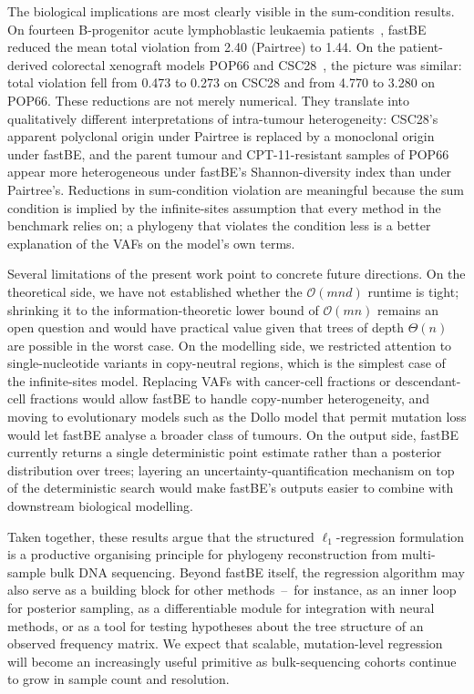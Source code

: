 \documentclass[11pt]{article}
\begin{document}
The biological implications are most clearly visible in the sum-condition results. On fourteen B-progenitor acute lymphoblastic leukaemia patients~\citep{wintersinger2022pairtree}, fastBE reduced the mean total violation from 2.40 (Pairtree) to 1.44. On the patient-derived colorectal xenograft models POP66 and CSC28~\citep{rehman2021diapause,ulintz2018polyclonal}, the picture was similar: total violation fell from 0.473 to 0.273 on CSC28 and from 4.770 to 3.280 on POP66. These reductions are not merely numerical. They translate into qualitatively different interpretations of intra-tumour heterogeneity: CSC28's apparent polyclonal origin under Pairtree is replaced by a monoclonal origin under fastBE, and the parent tumour and CPT-11-resistant samples of POP66 appear more heterogeneous under fastBE's Shannon-diversity index than under Pairtree's. Reductions in sum-condition violation are meaningful because the sum condition is implied by the infinite-sites assumption that every method in the benchmark relies on; a phylogeny that violates the condition less is a better explanation of the VAFs on the model's own terms.

Several limitations of the present work point to concrete future directions. On the theoretical side, we have not established whether the $\mathcal{O}(mnd)$ runtime is tight; shrinking it to the information-theoretic lower bound of $\mathcal{O}(mn)$ remains an open question and would have practical value given that trees of depth $\Theta(n)$ are possible in the worst case. On the modelling side, we restricted attention to single-nucleotide variants in copy-neutral regions, which is the simplest case of the infinite-sites model. Replacing VAFs with cancer-cell fractions or descendant-cell fractions would allow fastBE to handle copy-number heterogeneity, and moving to evolutionary models such as the Dollo model that permit mutation loss would let fastBE analyse a broader class of tumours. On the output side, fastBE currently returns a single deterministic point estimate rather than a posterior distribution over trees; layering an uncertainty-quantification mechanism on top of the deterministic search would make fastBE's outputs easier to combine with downstream biological modelling.

Taken together, these results argue that the structured $\ell_1$-regression formulation is a productive organising principle for phylogeny reconstruction from multi-sample bulk DNA sequencing. Beyond fastBE itself, the regression algorithm may also serve as a building block for other methods~--~for instance, as an inner loop for posterior sampling, as a differentiable module for integration with neural methods, or as a tool for testing hypotheses about the tree structure of an observed frequency matrix. We expect that scalable, mutation-level regression will become an increasingly useful primitive as bulk-sequencing cohorts continue to grow in sample count and resolution.



\end{document}
